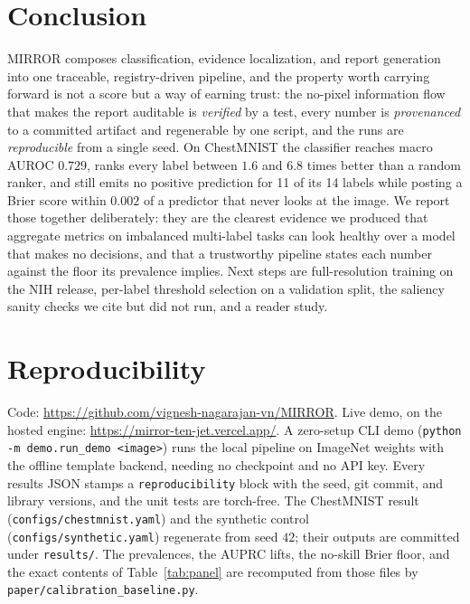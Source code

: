 \documentclass[conference]{IEEEtran}
\newcommand{\code}[1]{\texttt{\small #1}}
\begin{document}
\section{Conclusion}

MIRROR composes classification, evidence localization, and report generation into
one traceable, registry-driven pipeline, and the property worth carrying forward is
not a score but a way of earning trust: the no-pixel information flow that makes the
report auditable is \emph{verified} by a test, every number is \emph{provenanced} to
a committed artifact and regenerable by one script, and the runs are
\emph{reproducible} from a single seed.
On ChestMNIST the classifier reaches macro AUROC $0.729$, ranks every label between
$1.6$ and $6.8$ times better than a random ranker, and still emits no positive
prediction for 11 of its 14 labels while posting a Brier score within $0.002$ of a
predictor that never looks at the image. We report those together deliberately: they
are the clearest evidence we produced that aggregate metrics on imbalanced
multi-label tasks can look healthy over a model that makes no decisions, and that a
trustworthy pipeline states each number against the floor its prevalence implies.
Next steps are full-resolution training on the NIH release, per-label threshold
selection on a validation split, the saliency sanity checks we cite but did not run,
and a reader study.

\section*{Reproducibility}
\footnotesize
Code: \url{https://github.com/vignesh-nagarajan-vn/MIRROR}. Live demo, on the hosted
engine: \url{https://mirror-ten-jet.vercel.app/}. A zero-setup CLI demo
(\code{python -m demo.run\_demo <image>}) runs the local pipeline on ImageNet weights
with the offline template backend, needing no checkpoint and no API key. Every
results JSON stamps a \code{reproducibility} block with the seed, git commit, and
library versions, and the unit tests are torch-free. The ChestMNIST result
(\code{configs/chestmnist.yaml}) and the synthetic control
(\code{configs/synthetic.yaml}) regenerate from seed $42$; their outputs are
committed under \code{results/}. The prevalences, the AUPRC lifts, the no-skill Brier
floor, and the exact contents of Table~\ref{tab:panel} are recomputed from those
files by \code{paper/calibration\_baseline.py}.
\end{document}
